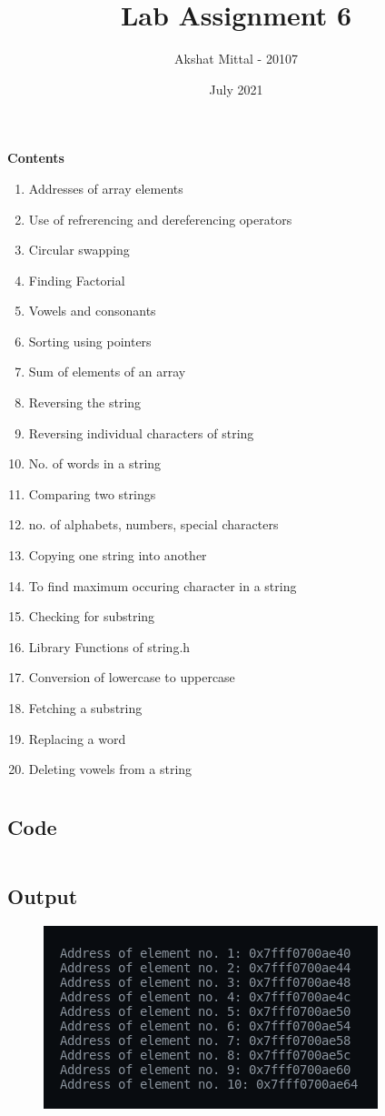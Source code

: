 \documentclass[12pt]{article}
\title{Lab Assignment 6}
\author{Akshat Mittal - 20107}
\date{July 2021}
\begin{document}
\maketitle
\vspace{7mm}
\textbf{Contents}
\vspace{7mm}
\begin{enumerate}
    \item Addresses of array elements
    \item Use of refrerencing and dereferencing operators
    \item Circular swapping
    \item Finding Factorial
    \item Vowels and consonants
    \item Sorting using pointers
    \item Sum of elements of an array
    \item Reversing the string
    \item Reversing individual characters of string
    \item No. of words in a string
    \item Comparing two strings
    \item no. of alphabets, numbers, special characters
    \item Copying one string into another
    \item To find maximum occuring character in a string
    \item Checking for substring
    \item Library Functions of string.h
    \item Conversion of lowercase to uppercase
    \item Fetching a substring
    \item Replacing a word
    \item Deleting vowels from a string
\end{enumerate}

\newpage
\section{}
\subsection{Code}
\inputminted{c}{q1.c}
\subsection{Output}
\begin{figure}[h]
    \centering
    \includegraphics{1.png}
\end{figure}
\end{document}
